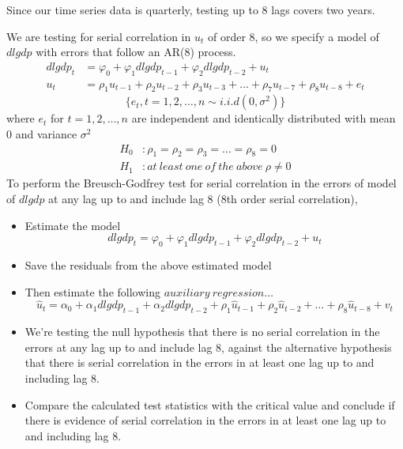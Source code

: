 \documentclass[12pt]{report}
\begin{document}
\noindent Since our time series data is quarterly, testing up to 8 lags covers two years.

\noindent We are testing for serial correlation in $u_t$ of order 8, so we specify a model of $dlgdp$ with errors that follow an AR(8) process.
\begin{align*}
dlgdp_t &= \varphi_0 + \varphi_1dlgdp_{t-1} + \varphi_2dlgdp_{t-2} + u_t \\
u_t &= \rho_1u_{t-1} + \rho_2u_{t-2} + \rho_3u_{t-3} + \dots + \rho_7u_{t-7} + \rho_8u_{t-8} + e_t
\end{align*} $$\{e_t, t=1,2,\dots,n \sim i.i.d(0,\sigma^2)\}$$ where $e_t$ for $t=1,2,\dots,n$ are independent and identically distributed with mean 0 and variance $\sigma^2$
\begin{align*}
H_0&: \rho_1 = \rho_2 = \rho_3 = \dots = \rho_8 = 0 \\
H_1&: at\ least\ one\ of\ the\ above\ \rho \neq 0
\end{align*}
To perform the Breusch-Godfrey test for serial correlation in the errors of model of $dlgdp$ at any lag up to and include lag 8 (8th order serial correlation),
\begin{itemize}
	\item Estimate the model $$dlgdp_t = \varphi_0 + \varphi_1dlgdp_{t-1} + \varphi_2dlgdp_{t-2} + u_t$$
	\item Save the residuals from the above estimated model 
	\item Then estimate the following $auxiliary\ regression \dots$ $$\hat{u}_t = \alpha_0 + \alpha_1dlgdp_{t-1} + \alpha_2dlgdp_{t-2} + \rho_1\hat{u}_{t-1} + \rho_2\hat{u}_{t-2} + \dots + \rho_8\hat{u}_{t-8} + v_t$$
	\item We're testing the null hypothesis that there is no serial correlation in the errors at any lag up to and include lag 8, against the alternative hypothesis that there is serial correlation in the errors in at least one lag up to and including lag 8.
	\item Compare the calculated test statistics with the critical value and conclude if there is evidence of serial correlation in the errors in at least one lag up to and including lag 8.
\end{itemize}
\end{document}
